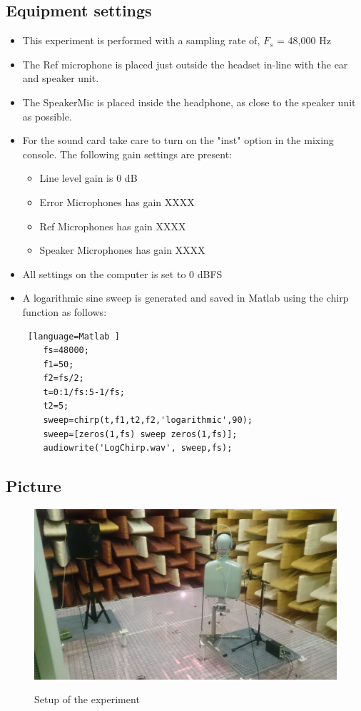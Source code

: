 \subsection{Equipment settings}
\begin{itemize}
	\item This experiment is performed with a sampling rate of, $F_{s}$ = 48,000 Hz
	\item The Ref microphone is placed just outside the headset in-line with the ear and speaker unit. 
	\item The SpeakerMic is placed inside the headphone, as close to the speaker unit as possible. 
	\item For the sound card take care to turn on the "inst" option in the mixing console. The following gain settings are present: 		
	\begin{itemize}
		\item Line level gain is 0 dB
		\item Error Microphones has gain XXXX
		\item Ref Microphones has gain XXXX
		\item Speaker Microphones has gain XXXX
	\end{itemize}
	\item All settings on the computer is set to 0 dBFS
	\item A logarithmic sine sweep is generated and saved in Matlab using the chirp function as follows:
	\begin{lstlisting} [language=Matlab	]
	fs=48000;
	f1=50;
	f2=fs/2;
	t=0:1/fs:5-1/fs;
	t2=5;
	sweep=chirp(t,f1,t2,f2,'logarithmic',90);
	sweep=[zeros(1,fs) sweep zeros(1,fs)];
	audiowrite('LogChirp.wav', sweep,fs);
	\end{lstlisting}
\end{itemize}

\subsection{Picture}
\begin{figure}[H]
	\includegraphics[width=\textwidth]{../Journal/Experiments/AngleOfIncidence/AngInSetup.jpg}
	\label{AngIncidenceSetup}	
	\caption{Setup of the experiment}
\end{figure}


